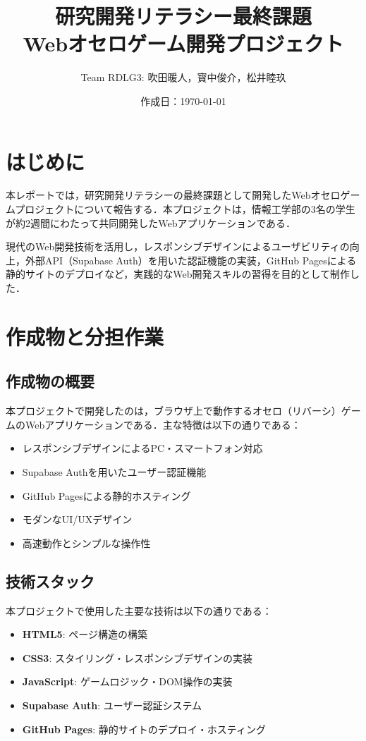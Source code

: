 \documentclass[10pt, a4paper]{jsarticle}
\title{\LARGE 研究開発リテラシー最終課題\\Webオセロゲーム開発プロジェクト}
\author{Team RDLG3: 吹田暖人，寳中俊介，松井睦玖}
\date{作成日：\today}
\begin{document}
 

\maketitle
\tableofcontents

\section{はじめに}\label{sec:introduction}
本レポートでは，研究開発リテラシーの最終課題として開発したWebオセロゲームプロジェクトについて報告する．本プロジェクトは，情報工学部の3名の学生が約2週間にわたって共同開発したWebアプリケーションである．

現代のWeb開発技術を活用し，レスポンシブデザインによるユーザビリティの向上，外部API（Supabase Auth）を用いた認証機能の実装，GitHub Pagesによる静的サイトのデプロイなど，実践的なWeb開発スキルの習得を目的として制作した．

\section{作成物と分担作業}\label{sec:product_overview}

\subsection{作成物の概要}
本プロジェクトで開発したのは，ブラウザ上で動作するオセロ（リバーシ）ゲームのWebアプリケーションである．主な特徴は以下の通りである：

\begin{itemize}
    \item レスポンシブデザインによるPC・スマートフォン対応
    \item Supabase Authを用いたユーザー認証機能
    \item GitHub Pagesによる静的ホスティング
    \item モダンなUI/UXデザイン
    \item 高速動作とシンプルな操作性
\end{itemize}

\subsection{技術スタック}
本プロジェクトで使用した主要な技術は以下の通りである：

\begin{itemize}
    \item \textbf{HTML5}: ページ構造の構築
    \item \textbf{CSS3}: スタイリング・レスポンシブデザインの実装
    \item \textbf{JavaScript}: ゲームロジック・DOM操作の実装
    \item \textbf{Supabase Auth}: ユーザー認証システム
    \item \textbf{GitHub Pages}: 静的サイトのデプロイ・ホスティング
\end{itemize}
\end{document}
